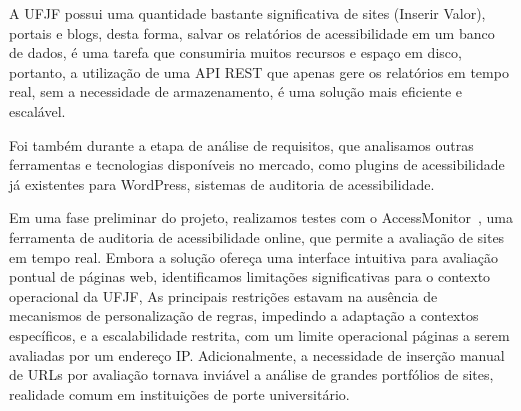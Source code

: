 \documentclass[12pt]{article}
\begin{document}
A UFJF possui uma quantidade bastante significativa de sites (Inserir Valor), portais e blogs, desta
forma, salvar os relatórios de acessibilidade em um banco de dados, é uma tarefa que 
consumiria muitos recursos e espaço em disco, portanto, a utilização de uma API REST
que apenas gere os relatórios em tempo real, sem a necessidade de armazenamento, é 
uma solução mais eficiente e escalável.
 
Foi também durante a etapa de análise de requisitos, que analisamos 
outras ferramentas e tecnologias disponíveis no mercado, como plugins 
de acessibilidade já existentes para WordPress, sistemas de auditoria de acessibilidade.

Em uma fase preliminar do projeto, realizamos testes com o AccessMonitor~\autocite{AM}, 
uma ferramenta de auditoria de acessibilidade online, que permite a avaliação de 
sites em tempo real. Embora a solução ofereça uma interface intuitiva para 
avaliação pontual de páginas web, identificamos limitações significativas para o 
contexto operacional da UFJF, As principais restrições estavam na ausência de 
mecanismos de personalização de regras, impedindo a adaptação a contextos 
específicos, e a escalabilidade restrita, com um limite operacional páginas a 
serem avaliadas por um endereço IP\@. Adicionalmente, a necessidade de inserção 
manual de URLs por avaliação tornava inviável a análise de grandes portfólios de 
sites, realidade comum em instituições de porte universitário.

\nocite{*}
\printbibliography[title={Referências}]
\end{document}
